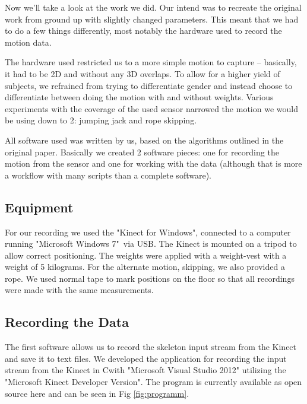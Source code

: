 \documentclass[a4paper]{article}
\newcommand{\CS}{C\nolinebreak\hspace{-.05em}\raisebox{.6ex}{\scriptsize\bf \#\ }}
\begin{document}
Now we'll take a look at the work we did.
Our intend was to recreate the original work from ground up with slightly changed parameters.
This meant that we had to do a few things differently, most notably the hardware used to record the motion data.

The hardware used restricted us to a more simple motion to capture – basically, it had to be 2D and without any 3D overlaps.
To allow for a higher yield of subjects, we refrained from trying to differentiate gender and instead choose to differentiate between doing the motion with and without weights.
Various experiments with the coverage of the used sensor narrowed the motion we would be using down to 2: jumping jack and rope skipping.

All software used was written by us, based on the algorithms outlined in the original paper.
Basically we created 2 software pieces: one for recording the motion from the sensor and one for working with the data (although that is more a workflow with many scripts than a complete software).

\subsection{Equipment}

For our recording we used the "Kinect for Windows"\texttrademark \cite{kinect}, connected to a computer running "Microsoft Windows 7"\textregistered \ via USB.
The Kinect is mounted on a tripod to allow correct positioning.
The weights were applied with a weight-vest with a weight of 5 kilograms.
For the alternate motion, skipping, we also provided a rope.
We used normal tape to mark positions on the floor so that all recordings were made with the same measurements.

\subsection{Recording the Data}

The first software allows us to record the skeleton input stream from the Kinect and save it to text files.
We developed the application for recording the input stream from the Kinect in \CS with "Microsoft Visual Studio 2012" utilizing the "Microsoft Kinect Developer Version".
The program is currently available as open source here \cite{csprogram} and can be seen in Fig \ref{fig:programm}.
\end{document}
